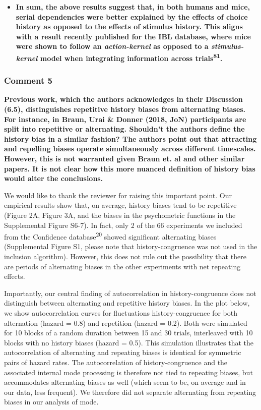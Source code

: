 \documentclass[
]{article}
\begin{document}
\begin{itemize}
{  stimulus-incongruent trials confirmed that choices (which are
  anti-correlated to stimuli at stimulus-incongruent trials) were the
  primary driver of attracting serial effects in perception.}
\item
  \textbf{In sum, the above results suggest that, in both humans and
  mice, serial dependencies were better explained by the effects of
  choice history as opposed to the effects of stimulus history. This
  aligns with a result recently published for the IBL database, where
  mice were shown to follow an \emph{action-kernel} as opposed to a
  \emph{stimulus-kernel} model when integrating information across
  trials\textsuperscript{81}.}
\end{itemize}

\hypertarget{comment-5-1}{%
\subsubsection{Comment 5}\label{comment-5-1}}

\textbf{Previous work, which the authors acknowledges in their
Discussion (6.5), distinguishes repetitive history biases from
alternating biases. For instance, in Braun, Urai \& Donner (2018, JoN)
participants are split into repetitive or alternating. Shouldn't the
authors define the history bias in a similar fashion? The authors point
out that attracting and repelling biases operate simultaneously across
different timescales. However, this is not warranted given Braun et. al
and other similar papers. It is not clear how this more nuanced
definition of history bias would alter the conclusions.}

We would like to thank the reviewer for raising this important point.
Our empirical results show that, on average, history biases tend to be
repetitive (Figure 2A, Figure 3A, and the biases in the psychometric
functions in the Supplemental Figure S6-7). In fact, only 2 of the 66
experiments we included from the Confidence database\textsuperscript{20}
showed significant alternating biases (Supplemental Figure S1, please
note that history-congruence was not used in the inclusion algorithm).
However, this does not rule out the possibility that there are periods
of alternating biases in the other experiments with net repeating
effects.

Importantly, our central finding of autocorrelation in
history-congruence does not distinguish between alternating and
repetitive history biases. In the plot below, we show autocorrelation
curves for fluctuations history-congruence for both alternation (hazard
= 0.8) and repetition (hazard = 0.2). Both were simulated for 10 blocks
of a random duration between 15 and 30 trials, interleaved with 10
blocks with no history biases (hazard = 0.5). This simulation
illustrates that the autocorrelation of alternating and repeating biases
is identical for symmetric pairs of hazard rates. The autocorrelation of
history-congruence and the associated internal mode processing is
therefore not tied to repeating biases, but accommodates alternating
biases as well (which seem to be, on average and in our data, less
frequent). We therefore did not separate alternating from repeating
biases in our analysis of mode.
\end{document}
